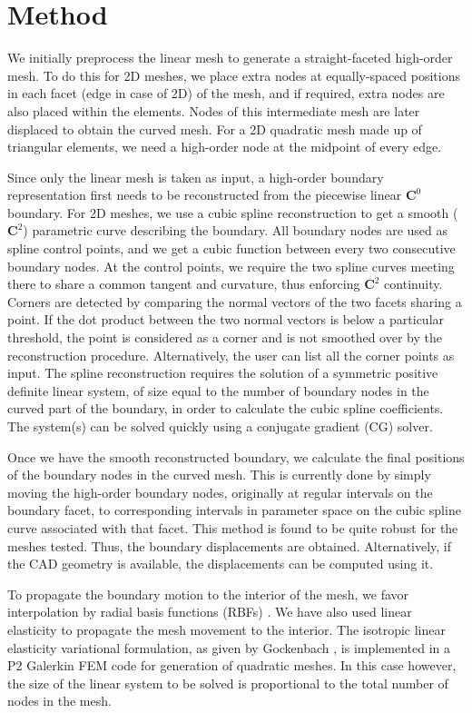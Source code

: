 \section{Method}

We initially preprocess the linear mesh to generate a straight-faceted high-order mesh. To do this for 2D meshes, we place extra nodes at equally-spaced positions in each facet (edge in case of 2D) of the mesh, and if required, extra nodes are also placed within the elements. Nodes of this intermediate mesh are later displaced to obtain the curved mesh. For a 2D quadratic mesh made up of triangular elements, we need a high-order node at the midpoint of every edge.

Since only the linear mesh is taken as input, a high-order boundary representation first needs to be reconstructed from the piecewise linear $\mathbf{C}^0$ boundary. For 2D meshes, we use a cubic spline reconstruction to get a smooth ($\mathbf{C}^2$) parametric curve describing the boundary. All boundary nodes are used as spline control points, and we get a cubic function between every two consecutive boundary nodes. At the control points, we require the two spline curves meeting there to share a common tangent and curvature, thus enforcing $\mathbf{C}^2$ continuity. Corners are detected by comparing the normal vectors of the two facets sharing a point. If the dot product between the two normal vectors is below a particular threshold, the point is considered as a corner and is not smoothed over by the reconstruction procedure. Alternatively, the user can list all the corner points as input. The spline reconstruction requires the solution of a symmetric positive definite linear system, of size equal to the number of boundary nodes in the curved part of the boundary, in order to calculate the cubic spline coefficients. The system(s) can be solved quickly using a conjugate gradient (CG) solver.

Once we have the smooth reconstructed boundary, we calculate the final positions of the boundary nodes in the curved mesh. This is currently done by simply moving the high-order boundary nodes, originally at regular intervals on the boundary facet, to corresponding intervals in parameter space on the cubic spline curve associated with that facet. This method is found to be quite robust for the meshes tested. Thus, the boundary displacements are obtained. Alternatively, if the CAD geometry is available, the displacements can be computed using it.

To propagate the boundary motion to the interior of the mesh, we favor interpolation by radial basis functions (RBFs) \cite{mm:rbf}. We have also used linear elasticity to propagate the mesh movement to the interior. The isotropic linear elasticity variational formulation, as given by Gockenbach \cite{gockenbach}, is implemented in a P2 Galerkin FEM code for generation of quadratic meshes. In this case however, the size of the linear system to be solved is proportional to the total number of nodes in the mesh.

